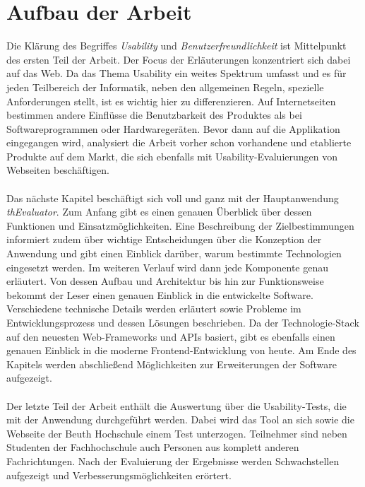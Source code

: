 %
%
%
%

\section{Aufbau der Arbeit}

Die Klärung des Begriffes \textit{Usability} und \textit{Benutzerfreundlichkeit} ist Mittelpunkt des ersten Teil der Arbeit. Der Focus der Erläuterungen konzentriert sich dabei auf das Web. Da das Thema Usability ein weites Spektrum umfasst und es für jeden Teilbereich der Informatik, neben den allgemeinen Regeln, spezielle Anforderungen stellt, ist es wichtig hier zu differenzieren. Auf Internetseiten bestimmen andere Einflüsse die Benutzbarkeit des Produktes als bei Softwareprogrammen oder Hardwaregeräten. Bevor dann auf die Applikation eingegangen wird, analysiert die Arbeit vorher schon vorhandene und etablierte Produkte auf dem Markt, die sich ebenfalls mit Usability-Evaluierungen von Webseiten beschäftigen.\\
\\
Das nächste Kapitel beschäftigt sich voll und ganz mit der Hauptanwendung \textit{thEvaluator}. Zum Anfang gibt es einen genauen Überblick über dessen Funktionen und Einsatzmöglichkeiten. Eine Beschreibung der Zielbestimmungen informiert zudem über wichtige Entscheidungen über die Konzeption der Anwendung und gibt einen Einblick darüber, warum bestimmte Technologien eingesetzt werden. Im weiteren Verlauf wird dann jede Komponente genau erläutert. Von dessen Aufbau und Architektur bis hin zur Funktionsweise bekommt der Leser einen genauen Einblick in die entwickelte Software. Verschiedene technische Details werden erläutert sowie Probleme im Entwicklungsprozess und dessen Lösungen beschrieben. Da der Technologie-Stack auf den neuesten Web-Frameworks und APIs basiert, gibt es ebenfalls einen genauen Einblick in die moderne Frontend-Entwicklung von heute. Am Ende des Kapitels werden abschließend Möglichkeiten zur Erweiterungen der Software aufgezeigt.\\
\\
Der letzte Teil der Arbeit enthält die Auswertung über die Usability-Tests, die mit der Anwendung durchgeführt werden. Dabei wird das Tool an sich sowie die Webseite der Beuth Hochschule einem Test unterzogen. Teilnehmer sind neben Studenten der Fachhochschule auch Personen aus komplett anderen Fachrichtungen. Nach der Evaluierung der Ergebnisse werden Schwachstellen aufgezeigt und Verbesserungsmöglichkeiten erörtert.